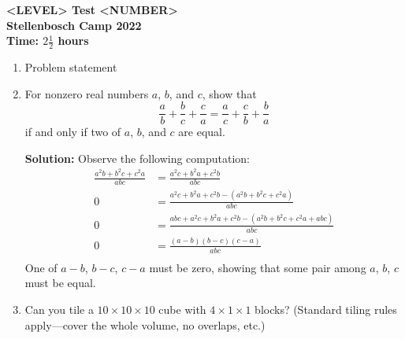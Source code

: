 \documentclass{article}
\begin{document}
\thispagestyle{empty}

\begin{center}
  \textbf{\Large <LEVEL> Test <NUMBER>}
  \\ \vspace{1em}
  \textbf{\large Stellenbosch Camp 2022}
  \\ \vspace{1em}
  \textbf{\large Time: $2\frac{1}{2}$ hours}
\end{center}

\bigskip

\begin{enumerate}[itemsep=\fill]

\item %
Problem statement


\item %
For nonzero real numbers $a$, $b$, and $c$, show that
\[ \frac{a}{b} +\frac{b}{c} +\frac{c}{a} = \frac{a}{c} +\frac{c}{b} +\frac{b}{a} \]
if and only if two of $a$, $b$, and $c$ are equal.

\textbf{Solution:} Observe the following computation:
\begin{align*}
\frac{a^{2}b + b^{2}c + c^{2}a}{abc} & = \frac{a^{2}c + b^{2}a + c^{2}b}{abc}\\
 0 & = \frac{a^{2}c + b^{2}a + c^{2}b -(a^{2}b + b^{2}c + c^{2}a)}{abc} \\
 0 & = \frac{abc + a^{2}c + b^{2}a + c^{2}b - (a^{2}b + b^{2}c + c^{2}a+abc)}{abc} \\
 0 & = \frac{(a-b)(b-c)(c-a)}{abc} \\
\end{align*}
One of $a-b$, $b-c$, $c-a$ must be zero, showing that some pair among $a$, $b$, $c$ must be equal.

\item %
Can you tile a $10\times 10\times 10$ cube with $4\times 1\times 1$ blocks? (Standard tiling rules apply---cover the whole volume, no overlaps, etc.)


\end{enumerate}
\end{document}
